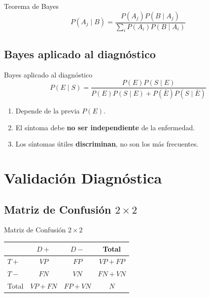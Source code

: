 \documentclass[
  ignorenonframetext,
  aspectratio=169,
]{beamer}
\providecommand{\tightlist}{%
  \setlength{\itemsep}{0pt}\setlength{\parskip}{0pt}}
\begin{document}
\begin{frame}{Teorema de Bayes}
\[P(A_j \mid B) = \frac{P(A_j) P(B \mid A_j)}{\sum_i P(A_i) P(B \mid A_i)}\]
\end{frame}

\begin{frame}
\end{frame}

\subsection{Bayes aplicado al
diagnóstico}\label{bayes-aplicado-al-diagnuxf3stico}

\begin{frame}{Bayes aplicado al diagnóstico}
\[P(E \mid S) = \frac{P(E) P(S \mid E)}{P(E)P(S\mid E) + P(\bar{E})P(S \mid \bar{E})}\]

\begin{enumerate}
\tightlist
\item
  Depende de la previa \(P(E)\).
\item
  El síntoma debe \textbf{no ser independiente} de la enfermedad.
\item
  Los síntomas útiles \textbf{discriminan}, no son los más frecuentes.
\end{enumerate}
\end{frame}

\begin{frame}
\end{frame}

\section{Validación Diagnóstica}\label{validaciuxf3n-diagnuxf3stica}

\subsection{\texorpdfstring{Matriz de Confusión
\(2 \times 2\)}{Matriz de Confusión 2 \textbackslash times 2}}\label{matriz-de-confusiuxf3n-2-times-2}

\begin{frame}{Matriz de Confusión \(2 \times 2\)}
\begin{tabular}{lccc}
\toprule
 & $D+$ & $D-$ & Total \\
\midrule
$T+$ & $VP$ & $FP$ & $VP+FP$ \\
$T-$ & $FN$ & $VN$ & $FN+VN$ \\
\midrule
Total & $VP+FN$ & $FP+VN$ & $N$ \\
\bottomrule
\end{tabular}
\end{frame}
\end{document}
